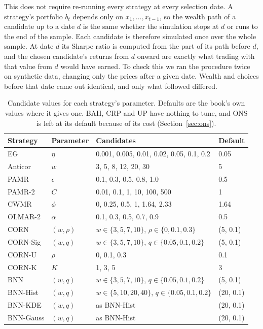 \documentclass[11pt]{article}
\begin{document}
This does not require re-running every strategy at every selection date.
A strategy's portfolio $b_t$ depends only on $x_1, \dots, x_{t-1}$, so the
wealth path of a candidate up to a date $d$ is the same whether the
simulation stops at $d$ or runs to the end of the sample. Each candidate
is therefore simulated once over the whole sample. At date $d$ its Sharpe
ratio is computed from the part of its path before $d$, and the chosen
candidate's returns from $d$ onward are exactly what trading with that
value from $d$ would have earned. To check this we ran the procedure twice
on synthetic data, changing only the prices after a given date. Wealth and
choices before that date came out identical, and only what followed
differed.

\begin{table}[h]
\centering
\small
\begin{tabular}{llll}
\toprule
Strategy & Parameter & Candidates & Default \\
\midrule
EG & $\eta$ & 0.001, 0.005, 0.01, 0.02, 0.05, 0.1, 0.2 & 0.05 \\
Anticor & $w$ & 3, 5, 8, 12, 20, 30 & 5 \\
PAMR & $\epsilon$ & 0.1, 0.3, 0.5, 0.8, 1.0 & 0.5 \\
PAMR-2 & $C$ & 0.01, 0.1, 1, 10, 100, 500 & 1 \\
CWMR & $\phi$ & 0, 0.25, 0.5, 1, 1.64, 2.33 & 1.64 \\
OLMAR-2 & $\alpha$ & 0.1, 0.3, 0.5, 0.7, 0.9 & 0.5 \\
CORN & $(w,\rho)$ & $w \in \{3,5,7,10\}$, $\rho \in \{0,0.1,0.3\}$ & (5, 0.1) \\
CORN-Sig & $(w,q)$ & $w \in \{3,5,7,10\}$, $q \in \{0.05,0.1,0.2\}$ & (5, 0.1) \\
CORN-U & $\rho$ & 0, 0.1, 0.3 & 0.1 \\
CORN-K & $K$ & 1, 3, 5 & 3 \\
BNN & $(w,q)$ & $w \in \{3,5,7,10\}$, $q \in \{0.05,0.1,0.2\}$ & (5, 0.1) \\
BNN-Hist & $(w,q)$ & $w \in \{5,10,20,40\}$, $q \in \{0.05,0.1,0.2\}$ & (20, 0.1) \\
BNN-KDE & $(w,q)$ & as BNN-Hist & (20, 0.1) \\
BNN-Gauss & $(w,q)$ & as BNN-Hist & (20, 0.1) \\
\bottomrule
\end{tabular}
\caption{Candidate values for each strategy's parameter. Defaults are the
book's own values where it gives one. BAH, CRP and UP have nothing to
tune, and ONS is left at its default because of its cost
(Section~\ref{sec:ons}).}
\label{tab:grids}
\end{table}
\end{document}
